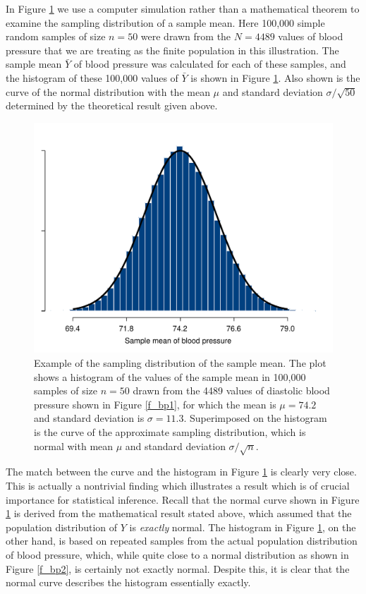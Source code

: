 In Figure \ref{f_sampld} we use a computer simulation rather than a
mathematical theorem to examine the sampling distribution of a sample
mean. Here 100,000 simple random samples of
size $n=50$ were drawn from the $N=4489$ values of blood
pressure that we are treating as the finite population in this
illustration. The sample mean $\bar{Y}$ of blood pressure was calculated
for each of these samples, and the histogram of these 100,000 values of
$\bar{Y}$ is shown in Figure \ref{f_sampld}. Also shown is the curve of
the normal distribution with the mean $\mu$ and standard deviation
$\sigma/\sqrt{50}$ determined by the theoretical result given above.

\begin{figure}[t]
\caption{Example of the sampling distribution of the sample mean. The
plot shows a histogram of the values of the sample mean in 100,000 samples
of size $n=50$ drawn from the 4489 values of diastolic blood pressure
shown in Figure \ref{f_bp1}, for which the mean is $\mu=74.2$ and
standard deviation is $\sigma=11.3$.
Superimposed on the histogram
is the curve of the approximate sampling
distribution, which is normal with mean $\mu$ and standard
deviation $\sigma/\sqrt{n}$.
}
\label{f_sampld}
\begin{center}
\vspace*{-2ex}
\includegraphics[width=12cm]{sampld1_bp}
\end{center}
\vspace*{-2ex}
\end{figure}

The match between the curve and the histogram in Figure \ref{f_sampld}
is clearly very close. This is actually a nontrivial finding which
illustrates a result which is of crucial importance for statistical
inference. Recall that the normal curve shown in Figure \ref{f_sampld}
is derived from the mathematical result stated above, which assumed that
the population distribution of $Y$ is \emph{exactly} normal. The
histogram in Figure \ref{f_sampld}, on the other hand, is based on
repeated samples from the actual population distribution of blood
pressure, which, while quite close to a normal distribution as shown in
Figure \ref{f_bp2}, is certainly not exactly normal. Despite this, it is
clear that the normal curve describes the histogram essentially exactly.

